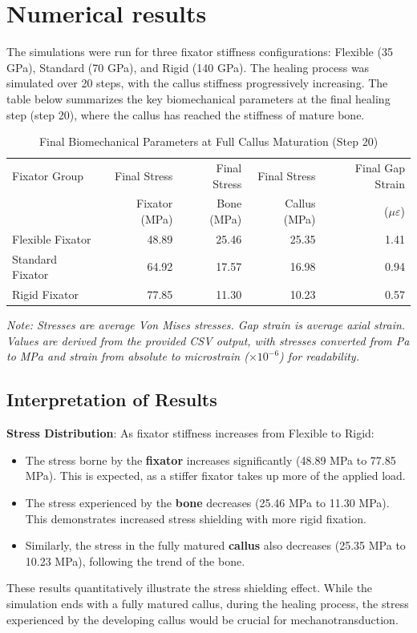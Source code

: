 \documentclass{article}
\begin{document}
\section{Numerical results}

The simulations were run for three fixator stiffness configurations: Flexible (35 GPa), Standard (70 GPa), and Rigid (140 GPa). The healing process was simulated over 20 steps, with the callus stiffness progressively increasing. The table below summarizes the key biomechanical parameters at the final healing step (step 20), where the callus has reached the stiffness of mature bone.

\begin{table}[h!]
  \centering
  \caption{Final Biomechanical Parameters at Full Callus Maturation (Step 20)}
  \label{tab:final_results}
  \begin{tabular}{lrrrr}
    \toprule
    Fixator Group    & Final Stress  & Final Stress & Final Stress & Final Gap Strain   \\
                     & Fixator (MPa) & Bone (MPa)   & Callus (MPa) & ($\mu\varepsilon$) \\
    \midrule
    Flexible Fixator & 48.89         & 25.46        & 25.35        & 1.41               \\
    Standard Fixator & 64.92         & 17.57        & 16.98        & 0.94               \\
    Rigid Fixator    & 77.85         & 11.30        & 10.23        & 0.57               \\
    \bottomrule
  \end{tabular}


  \footnotesize{\textit{Note: Stresses are average Von Mises stresses. Gap strain is average axial strain. Values are derived from the provided CSV output, with stresses converted from Pa to MPa and strain from absolute to microstrain ($\times 10^{-6}$) for readability.}}
\end{table}

\subsection{Interpretation of Results}

\textbf{Stress Distribution}:
As fixator stiffness increases from Flexible to Rigid:
\begin{itemize}
  \item The stress borne by the \textbf{fixator} increases significantly (48.89 MPa to 77.85 MPa). This is expected, as a stiffer fixator takes up more of the applied load.
  \item The stress experienced by the \textbf{bone} decreases (25.46 MPa to 11.30 MPa). This demonstrates increased stress shielding with more rigid fixation.
  \item Similarly, the stress in the fully matured \textbf{callus} also decreases (25.35 MPa to 10.23 MPa), following the trend of the bone.
\end{itemize}
These results quantitatively illustrate the stress shielding effect. While the simulation ends with a fully matured callus, during the healing process, the stress experienced by the developing callus would be crucial for mechanotransduction.
\end{document}
